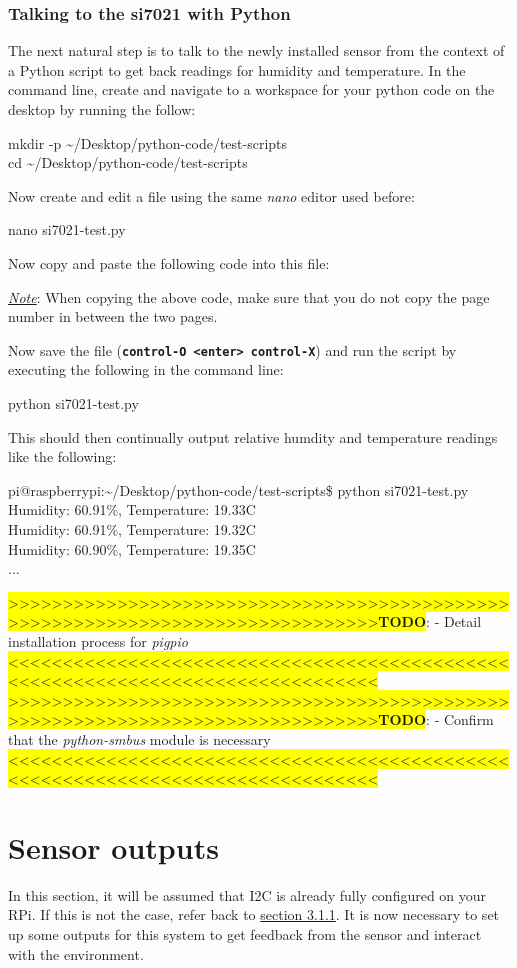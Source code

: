 \documentclass{article}
\newcommand*{\myfont}{\fontfamily{pcr}\selectfont}
\newcommand{\codeb}[2]{
  \begin{tcolorbox}[width=\textwidth,colback={SpringGreen},title={#1},colbacktitle=darkgreen,coltitle=SpringGreen]
    \myfont
    #2
  \end{tcolorbox}
} %
\newcommand{\outputb}[2]{
  \begin{tcolorbox}[width=\textwidth,colback={light-gray},title={#1},colbacktitle=gray,coltitle=light-gray]
    \myfont
    #2
  \end{tcolorbox}
} %
\newcommand{\todo}[1]{\newline\noindent\colorbox{Yellow}{>>>>>>>>>>>>>>>>>>>>>>>>>>>>>>>>>>>>>>>>>>>>>>>>>>>>>>>>>>>>>>>>>>>>>>>>>>>>>>>>}\newline\colorbox{Yellow}{\textbf{TODO}}: - #1 \newline \colorbox{Yellow}{<<<<<<<<<<<<<<<<<<<<<<<<<<<<<<<<<<<<<<<<<<<<<<<<<<<<<<<<<<<<<<<<<<<<<<<<<<<<<<<<}\newline}
\begin{document}
  \subsubsection{Talking to the si7021 with Python}
    The next natural step is to talk to the newly installed sensor from the context of a Python script to get back readings for humidity and temperature. In the command line, create and navigate to a workspace for your python code on the desktop by running the follow:
    \codeb{Create and navigate to your workspace}
    {
      mkdir -p \textasciitilde/Desktop/python-code/test-scripts \\
      cd \textasciitilde/Desktop/python-code/test-scripts
    }
    \noindent
    Now create and edit a file using the same \textit{nano} editor used before:
    \codeb{Create si7021 Python testing script file}
    {
      nano si7021-test.py
    }
    \noindent
    Now copy and paste the following code into this file:
    
    \underline{\textit{Note}}: When copying the above code, make sure that you do not copy the page number in between the two pages.

    \newline

    \newline

    \noindent
    Now save the file (\textbf{\texttt{control-O <enter> control-X}}) and run the script by executing the following in the command line:
    \codeb{Run the test script for si7021 sensor}{python si7021-test.py}
    This should then continually output relative humdity and temperature readings like the following:
    \outputb{Test script output for si7021 sensor}
    {
      pi@raspberrypi:\textasciitilde/Desktop/python-code/test-scripts\$ python si7021-test.py        \\
      Humidity: 60.91\%, Temperature: 19.33\degree C                                   \\
      Humidity: 60.91\%, Temperature: 19.32\degree C                                   \\
      Humidity: 60.90\%, Temperature: 19.35\degree C                                   \\
      ...
    }

    \todo{Detail installation process for \textit{pigpio}}
    \todo{Confirm that the \textit{python-smbus} module is necessary}
\section{Sensor outputs}
  In this section, it will be assumed that I2C is already fully configured on your RPi. If this is not the case, refer back to \hyperref[sec:configuring-i2c]{section 3.1.1}. It is now necessary to set up some outputs for this system to get feedback from the sensor and interact with the environment.
\end{document}
